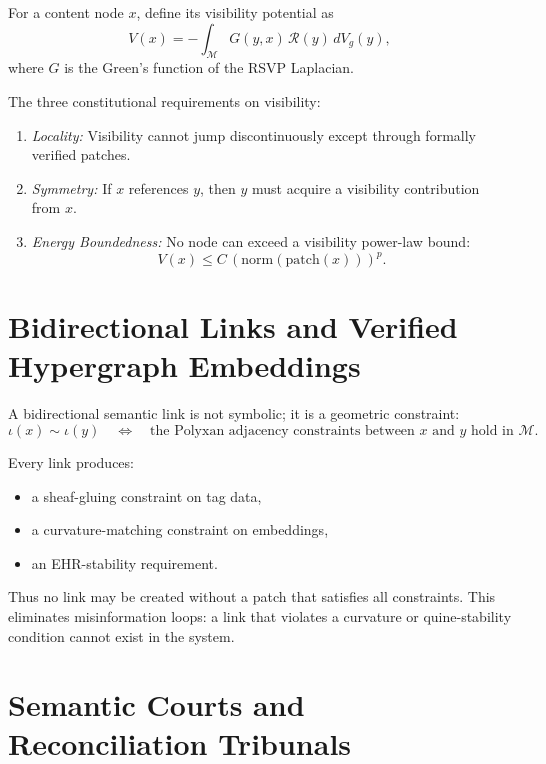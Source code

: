 \begin{definition}
For a content node $x$, define its visibility potential as
\[
V(x) = - \int_{\mathcal{M}} G(y,x) \, \mathcal{R}(y) \, dV_g(y),
\]
where $G$ is the Green's function of the RSVP Laplacian.
\end{definition}

The three constitutional requirements on visibility:

\begin{enumerate}
  \item \emph{Locality:} Visibility cannot jump discontinuously except
        through formally verified patches.
  \item \emph{Symmetry:} If $x$ references $y$, then $y$ must acquire a
        visibility contribution from $x$.
  \item \emph{Energy Boundedness:} No node can exceed a visibility
        power-law bound:
        \[
        V(x) \le C \, (\mathrm{norm}(\mathrm{patch}(x)))^{p}.
        \]
\end{enumerate}

\section{Bidirectional Links and Verified Hypergraph Embeddings}

A bidirectional semantic link is not symbolic;
it is a geometric constraint:
\[
\iota(x) \sim \iota(y)
\quad\Leftrightarrow\quad
\text{the Polyxan adjacency constraints between $x$ and $y$ hold in $\mathcal{M}$}.
\]

Every link produces:

\begin{itemize}
  \item a sheaf-gluing constraint on tag data,
  \item a curvature-matching constraint on embeddings,
  \item an EHR-stability requirement.
\end{itemize}

Thus no link may be created without a patch that satisfies all constraints.
This eliminates misinformation loops: a link that violates a curvature
or quine-stability condition cannot exist in the system.

\section{Semantic Courts and Reconciliation Tribunals}

